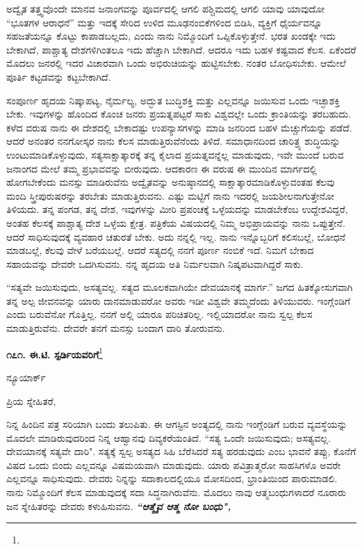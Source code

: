 ಅದ್ವೈತ ತತ್ತ್ವವೊಂದೇ ಮಾನವ ಜನಾಂಗವನ್ನು ಪೂರ್ವದಲ್ಲಿ ಆಗಲಿ ಪಶ್ಚಿಮದಲ್ಲಿ ಆಗಲಿ ಯಾವು ಯಾವುದೋ ``ಭೂತಗಳ ಆರಾಧನೆ'' ಮತ್ತು ಇದಕ್ಕೆ ಸೇರಿದ ಉಳಿದ ಮೂಢನಂಬಿಕೆಗಳಿಂದ ಬಿಡಿಸಿ, ವ್ಯಕ್ತಿಗೆ ಧೈರ್ಯವನ್ನೂ ಸಹಜತೆಯನ್ನೂ ಕೊಟ್ಟು ಕಾಪಾಡಬಲ್ಲದು, ಎಂದು ನಾನು ನಿಮ್ಮೊಂದಿಗೆ ಒಪ್ಪಿಕೊಳ್ಳುತ್ತೇನೆ. ಭರತ ಖಂಡಕ್ಕೇ ಇದು ಬೇಕಾಗಿದೆ, ಪಾಶ್ಚಾತ್ಯ ದೇಶಗಳಿಗಿಂತಲೂ ಇದು ಹೆಚ್ಚಾಗಿ ಬೇಕಾಗಿದೆ. ಆದರೂ ಇದು ಬಹಳ ಕಷ್ಟವಾದ ಕೆಲಸ. ಏಕೆಂದರೆ ಮೊದಲು ಜನರಲ್ಲಿ ಇದರ ವಿಚಾರವಾಗಿ ಒಂದು ಅಭಿರುಚಿಯನ್ನು ಹುಟ್ಟಿಸಬೇಕು. ನಂತರ ಬೋಧಿಸಬೇಕು. ಆಮೇಲೆ ಪೂರ್ತಿ ಕಟ್ಟಡವನ್ನು ಕಟ್ಟಬೇಕಾಗಿದೆ.

ಸಂಪೂರ್ಣ ಹೃದಯ ನಿಷ್ಕಾಪಟ್ಯ, ನೈರ್ಮಲ್ಯ, ಅದ್ಭುತ ಬುದ್ಧಿಶಕ್ತಿ ಮತ್ತು ಎಲ್ಲವನ್ನೂ ಜಯಿಸುವ ಒಂದು ಇಚ್ಛಾಶಕ್ತಿ ಬೇಕು. ಇವುಗಳನ್ನು ಹೊಂದಿದ ಕೊಂಚ ಜನರು ಪ್ರಯತ್ನಪಟ್ಟರೆ ಸಾಕು ವಿಶ್ವದಲ್ಲೇ ಒಂದು ಕ್ರಾಂತಿಯನ್ನು ತರಬಹುದು. ಕಳೆದ ವರುಷ ನಾನು ಈ ದೇಶದಲ್ಲಿ ಬೇಕಾದಷ್ಟು ಉಪನ್ಯಾಸಗಳನ್ನು ಮಾಡಿ ಜನರಿಂದ ಬಹಳ ಮೆಚ್ಚುಗೆಯನ್ನು ಪಡೆದೆ. ಆದರೆ ಅನಂತರ ನನಗೋಸ್ಕರ ನಾನು ಕೆಲಸ ಮಾಡುತ್ತಿರುವೆನೆಂದು ತಿಳಿದೆ. ಸಮಾಧಾನದಿಂದ ಚಾರಿತ್ರ್ಯ ಶುದ್ಧಿಯನ್ನು ಉಂಟುಮಾಡಿಕೊಳ್ಳುವುದು, ಸತ್ಯಸಾಕ್ಷಾತ್ಕಾರಕ್ಕೆ ತನ್ನ ಕೈಲಾದ ಪ್ರಯತ್ನವನ್ನೆಲ್ಲ ಮಾಡುವುದು, ಇವೇ ಮುಂದೆ ಬರುವ ಜನಾಂಗದ ಮೇಲೆ ತಮ್ಮ ಪ್ರಭಾವವನ್ನು ಬೀರುವುದು. ಆದಕಾರಣ ಈ ವರುಷ ಈ ಮುಂದಿನ ಮಾರ್ಗದಲ್ಲಿ ಹೋಗಬೇಕೆಂದು ಮನಸ್ಸು ಮಾಡಿರುವೆನು\enginline{-} ಅದ್ವೈತವನ್ನು ಅನುಷ್ಠಾನದಲ್ಲಿ ಸಾಕ್ಷಾತ್ಕಾರಮಾಡಿಕೊಳ್ಳುವಂತಹ ಕೆಲವು ಮಂದಿ ಸ್ತ್ರೀಪುರುಷರನ್ನು ತರಬೇತು ಮಾಡುತ್ತಿರುವನು. ಎಷ್ಟು ಮಟ್ಟಿಗೆ ನಾನು ಇದರಲ್ಲಿ ಜಯಶೀಲನಾಗುತ್ತೇನೋ ತಿಳಿಯದು. ತನ್ನ ಪಂಗಡ, ತನ್ನ ದೇಶ, ಇವುಗಳನ್ನು ಮೀರಿ ಪ್ರಪಂಚಕ್ಕೆ ಒಳ್ಳೆಯದನ್ನು ಮಾಡಬೇಕೆಂಬ ಉದ್ದೇಶವಿದ್ದರೆ, ಅಂತಹ ಕೆಲಸಕ್ಕೆ ಪಾಶ್ಚಾತ್ಯ ದೇಶ ಒಳ್ಳೆಯ ಕ್ಷೇತ್ರ. ಪತ್ರಿಕೆಯ ವಿಷಯದಲ್ಲಿ ನಿಮ್ಮ ಅಭಿಪ್ರಾಯವನ್ನು ನಾನು ಒಪ್ಪುತ್ತೇನೆ. ಆದರೆ ಸಾಧಿಸುವುದಕ್ಕೆ ವ್ಯವಹಾರ ಚತುರತೆ ಬೇಕು. ಅದು ನನ್ನಲ್ಲಿ ಇಲ್ಲ. ನಾನು ಇನ್ನೊಬ್ಬರಿಗೆ ಕಲಿಸಬಲ್ಲೆ, ಬೋಧನೆ ಮಾಡಬಲ್ಲೆ, ಕೆಲವು ವೇಳೆ ಬರೆಯಬಲ್ಲೆ. ಆದರೆ ಸತ್ಯದಲ್ಲಿ ನನಗೆ ಪೂರ್ಣ ನಂಬಿಕೆ ಇದೆ. ನಿಮಗೆ ಬೇಕಾದ ಸಹಾಯವನ್ನು ದೇವರೇ ಒದಗಿಸುವನು. ನನ್ನ ಹೃದಯ ಅತಿ ನಿರ್ಮಲವಾಗಿ ನಿಷ್ಕಪಟವಾಗಿದ್ದರೆ ಸಾಕು.

“ಸತ್ಯವೇ ಜಯಿಸುವುದು, ಅಸತ್ಯವಲ್ಲ. ಸತ್ಯದ ಮೂಲಕವಾಗಿಯೇ ದೇವಯಾನಕ್ಕೆ ಮಾರ್ಗ.” ಜಗದ ಹಿತಕ್ಕೋಸುಗವಾಗಿ ತನ್ನ ಅಲ್ಪ ಜೀವನವನ್ನು ಯಾರು ದಾನಮಾಡುವರೋ ಅವರು ಇಡೀ ವಿಶ್ವವೇ ತಮ್ಮದೆಂದು ತಿಳಿಯುವರು. ಇಂಗ್ಲೆಂಡಿಗೆ ಎಂದು ಬರುವೆನೋ ಗೊತ್ತಿಲ್ಲ. ನನಗೆ ಅಲ್ಲಿ ಯಾರೂ ಪರಿಚಿತರಿಲ್ಲ. ಇಲ್ಲಿಯಾದರೋ ನಾನು ಸ್ವಲ್ಪ ಕೆಲಸ ಮಾಡುತ್ತಿರುವೆನು. ದೇವರೇ ತನಗೆ ಮನಸ್ಸು ಬಂದಾಗ ದಾರಿ ತೋರುವನು.

\begin{center}
\textbf{೧೭೧. ಈ.ಟಿ. ಸ್ಪರ್ಡಿಯವರಿಗೆ}\footnote{}
\end{center}

\begin{flushright}
ನ್ಯೂಯಾರ್ಕ್
\end{flushright}

\noindent
ಪ್ರಿಯ ಸ್ನೇಹಿತರೆ,

ನಿನ್ನ ಹಿಂದಿನ ಪತ್ರ ಸರಿಯಾಗಿ ಬಂದು ತಲುಪಿತು. ಈ ಆಗಸ್ಟಿನ ಅಂತ್ಯದಲ್ಲಿ ನಾನು ಇಂಗ್ಲೆಂಡಿಗೆ ಬರುವ ವ್ಯವಸ್ಥೆಯನ್ನು ಮೊದಲೇ ಮಾಡಿರುವುದರಿಂದ ನಿನ್ನ ಆಹ್ವಾನವು ದಿವ್ಯಕರೆಯಂತಿದೆ. “ಸತ್ಯ ಒಂದೇ ಜಯಿಸುವುದು; ಅಸತ್ಯವಲ್ಲ. ದೇವಯಾನಕ್ಕೆ ಸತ್ಯವೇ ದಾರಿ". ಸತ್ಯಕ್ಕೆ ಸ್ವಲ್ಪ ಅಸತ್ಯದ ಸಿಹಿ ಬೆರೆಸಿದರೆ ಸತ್ಯ ಹರಡುವುದು ಎಂಬ ಭಾವನೆ ತಪ್ಪು, ಕೊನೆಗೆ ವಿಷದ ಒಂದು ಬಿಂದು ಎಲ್ಲವನ್ನೂ ವಿಷಮಯವಾಗಿ ಮಾಡುವುದು. ಯಾರು ಪವಿತ್ರಾತ್ಮರೋ ಸಾಹಸಿಗಳೊ ಅವರೇ ಎಲ್ಲವನ್ನೂ ಸಾಧಿಸುವುದು. ದೇವರು ನಿನ್ನನ್ನು ಸದಾಕಾಲದಲ್ಲಿಯೂ ಮೋಸದಿಂದ, ಭ್ರಾಂತಿಯಿಂದ ಪಾರುಮಾಡಲಿ. ನಾನು ನಿಮ್ಮೊಂದಿಗೆ ಕೆಲಸ ಮಾಡುವುದಕ್ಕೆ ಸದಾ ಸಿದ್ಧನಾಗಿರುವೆನು. ಮೊದಲು ನಾವು ಆತ್ಮಬಂಧುಗಳಾದರೆ ನೂರಾರು ಜನ ಸ್ನೇಹಿತರನ್ನು ದೇವರು ಕಳುಹಿಸುವನು. \textbf{\textit{``ಆತ್ಮೈವ ಆತ್ಮ ನೋ ಬಂಧು", }}

